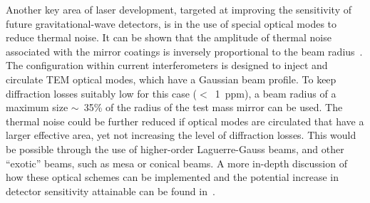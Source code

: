 \documentclass{article}
\begin{document}
%
%

Another key area of laser development, targeted at improving the sensitivity of
future gravitational-wave detectors, is in the use of special optical modes to reduce thermal noise. It can be shown that the amplitude of thermal
noise associated with the mirror coatings is inversely proportional to the beam
radius~\cite{Nakagawa:2002}. The configuration within current interferometers is
designed to inject and circulate TEM optical modes, which have a
Gaussian beam profile.  To keep diffraction losses suitably low for this case
($<$~1~ppm), a beam radius of a maximum size $\sim$~35\% of the radius of the test mass
mirror can be used. The thermal noise could be further reduced if optical modes
are circulated that have a larger effective area, yet not increasing the level
of diffraction losses. This would be possible through the use of higher-order
Laguerre-Gauss beams, and other ``exotic'' beams, such as mesa or conical beams.
A more in-depth discussion of how these optical schemes can be implemented and
the potential increase in detector sensitivity attainable can be found
in~\cite{Vinet:2009}.
\end{document}
